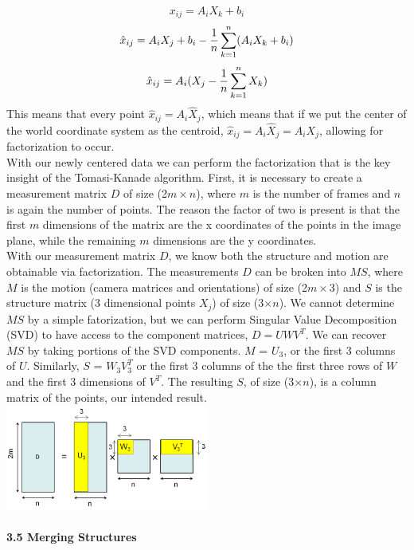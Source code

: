 \documentclass[12pt]{article}
\begin{document}
\begin{multicols}{2}
\[x_{ij} = A_{i}X_{k} + b_{i}\]
\[\hat{x}_{ij} = A_{i}X_{j} + b_{i} - {{1}\over{n}} \sum_{k=1}^{n} (A_{i}X_{k} + b_{i})\]
\[\hat{x}_{ij} = A_{i}(X_{j}  - {{1}\over{n}} \sum_{k=1}^{n} X_{k})\]
This means that every point $\hat{x}_{ij} = A_{i}\hat{X}_{j}$, which means that if we put the center of the world coordinate system as the centroid, $\hat{x}_{ij} = A_{i}\hat{X}_{j} = A_{i}X_{j}$, allowing for factorization to occur. \\
\indent With our newly centered data we can perform the factorization that is the key insight of the Tomasi-Kanade algorithm. First, it is necessary to create a measurement matrix $D$ of size (2$m \times n$), where $m$ is the number of frames and $n$ is again the number of points. The reason the factor of two is present is that the first $m$ dimensions of the matrix are the x coordinates of the points in the image plane, while the remaining $m$ dimensions are the y coordinates. \\
\indent	With our measurement matrix $D$, we know both the structure and motion are obtainable via factorization. The measurements $D$ can be broken into $MS$, where $M$ is the motion (camera matrices and orientations) of size (2$m \times$3) and $S$ is the structure matrix (3 dimensional points $X_{j}$) of size (3$\times n$). We cannot determine $MS$ by a simple fatorization, but we can perform Singular Value Decomposition (SVD) to have access to the component matrices, $D = UWV^T$. We can recover $MS$ by taking portions of the SVD components. $M$ = $U_{3}$, or the first 3 columns of $U$. Similarly, $S$ = $W_{3}V^{T}_{3}$ or the first 3 columns of the the first three rows of $W$ and the first 3 dimensions of $V^{T}$. The resulting $S$, of size (3$\times n$), is a column matrix of the points, our intended result. 
\includegraphics[width=0.5\textwidth]{images/SVD_of_D.png}
\\\\
{\large \textbf{3.5 Merging Structures}}\\

\end{multicols}
\end{document}
